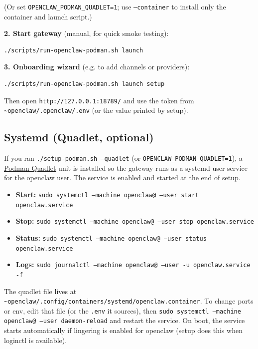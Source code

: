 (Or set \texttt{OPENCLAW\_PODMAN\_QUADLET=1}; use \texttt{--container} to install only the container and launch script.)

\textbf{2. Start gateway} (manual, for quick smoke testing):

\begin{lstlisting}[language=bash]
./scripts/run-openclaw-podman.sh launch
\end{lstlisting}


\textbf{3. Onboarding wizard} (e.g. to add channels or providers):

\begin{lstlisting}[language=bash]
./scripts/run-openclaw-podman.sh launch setup
\end{lstlisting}


Then open \texttt{http://127.0.0.1:18789/} and use the token from \texttt{\textasciitilde{}openclaw/.openclaw/.env} (or the value printed by setup).

\subsection{Systemd (Quadlet, optional)}


If you ran \texttt{./setup-podman.sh --quadlet} (or \texttt{OPENCLAW\_PODMAN\_QUADLET=1}), a \href{https://docs.podman.io/en/latest/markdown/podman-systemd.unit.5.html}{Podman Quadlet} unit is installed so the gateway runs as a systemd user service for the openclaw user. The service is enabled and started at the end of setup.

\begin{itemize}
  \item \textbf{Start:} \texttt{sudo systemctl --machine openclaw@ --user start openclaw.service}
  \item \textbf{Stop:} \texttt{sudo systemctl --machine openclaw@ --user stop openclaw.service}
  \item \textbf{Status:} \texttt{sudo systemctl --machine openclaw@ --user status openclaw.service}
  \item \textbf{Logs:} \texttt{sudo journalctl --machine openclaw@ --user -u openclaw.service -f}
\end{itemize}


The quadlet file lives at \texttt{\textasciitilde{}openclaw/.config/containers/systemd/openclaw.container}. To change ports or env, edit that file (or the \texttt{.env} it sources), then \texttt{sudo systemctl --machine openclaw@ --user daemon-reload} and restart the service. On boot, the service starts automatically if lingering is enabled for openclaw (setup does this when loginctl is available).

